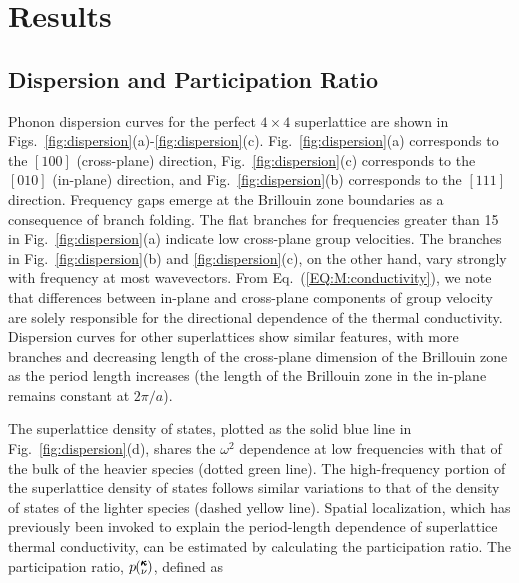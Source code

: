 \documentclass[aps,prb,preprint,preprintnumbers,amsmath,amssymb,floatfix,superscriptaddress]{revtex4}
\newcommand{\kv}{\mspace{-4.0mu}\left(\mspace{-8.0mu}
\begin{smallmatrix}&\pmb{\kappa} \\&\nu\end{smallmatrix}
\mspace{-3.0mu}\right)}
\begin{document}
\section{Results}\label{SEC:results}
\subsection{Dispersion and Participation Ratio}

Phonon dispersion curves for the perfect $4\times4$ superlattice are shown in Figs.~\ref{fig:dispersion}(a)-\ref{fig:dispersion}(c). Fig.~\ref{fig:dispersion}(a) corresponds to the $[1 0 0]$ (cross-plane) direction, Fig.~\ref{fig:dispersion}(c) corresponds to the $[0 1 0]$ (in-plane) direction, and Fig.~\ref{fig:dispersion}(b) corresponds to the $[1 1 1]$ direction. Frequency gaps emerge at the Brillouin zone boundaries as a consequence of branch folding.\cite{PhysRevB.38.1427,PhysRevB.60.2627} The flat branches for frequencies greater than 15 in Fig.~\ref{fig:dispersion}(a) indicate low cross-plane group velocities. The branches in Fig.~\ref{fig:dispersion}(b) and \ref{fig:dispersion}(c), on the other hand, vary strongly with frequency at most wavevectors. From Eq.~(\ref{EQ:M:conductivity}), we note that differences between in-plane and cross-plane components of group velocity are solely responsible for the directional dependence of the thermal conductivity.  Dispersion curves for other superlattices show similar features, with more branches and decreasing length of the cross-plane dimension of the Brillouin zone as the period length increases (the length of the Brillouin zone in the in-plane remains constant at $2\pi/a$).
\renewcommand{\topfraction}{0.7}
\begin{figure*}%
\begin{center}
\renewcommand{\figure}{Fig.}
\caption{(a),(b),(c) Dispersion, (d) density of states and (e) inverse participation ratio for a $4\times4$ superlattice. Labeled gray squares represent select modes for Fig.~\ref{fig:sed}.}
\label{fig:dispersion}
\end{center}
\end{figure*}
The superlattice density of states, plotted as the solid blue line in Fig.~\ref{fig:dispersion}(d), shares the $\omega^2$ dependence at low frequencies with that of the bulk of the heavier species (dotted green line). The high-frequency portion of the superlattice density of states follows similar variations to that of the density of states of the lighter species (dashed yellow line). Spatial localization, which has previously been invoked to explain the period-length dependence of superlattice thermal conductivity, \cite{PhysRevB.61.3091} can be estimated by calculating the participation ratio. The participation ratio, $p\kv$, defined as\cite{PhysRevB.70.235214}
\end{document}
